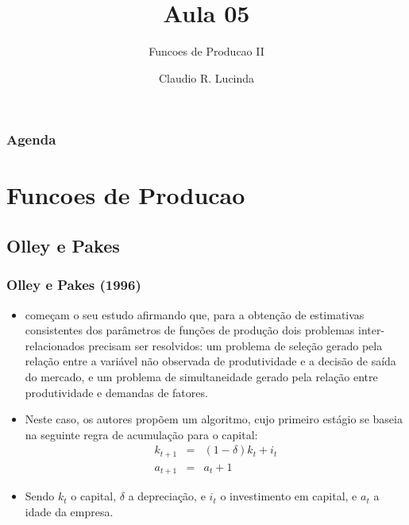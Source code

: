 \documentclass{beamer}
\title{Aula 05}
\subtitle{Funcoes de Producao II}
\author{Claudio R. Lucinda}
\institute{FEA-RP/USP}
\date{}
\begin{document}
\frame{\titlepage}
\begin{frame}\frametitle{Agenda}
  \tableofcontents[pausesections]
\end{frame}

\section{Funcoes de Producao}

\subsection{Olley e Pakes}

\begin{frame}\frametitle{Olley e Pakes (1996)}
\begin{itemize}
\item \citet{Olley1996} começam o seu estudo afirmando que, para a obtenção
de estimativas consistentes dos parâmetros de funções de produção
dois problemas inter-relacionados precisam ser resolvidos: um problema
de seleção gerado pela relação entre a variável não observada de produtividade
e a decisão de saída do mercado, e um problema de simultaneidade gerado
pela relação entre produtividade e demandas de fatores. 
\item Neste caso, os autores propõem um algoritmo, cujo primeiro estágio
se baseia na seguinte regra de acumulação para o capital:
\begin{eqnarray*}
k_{t+1} & = & (1-\delta)k_{t}+i_{t}\\
a_{t+1} & = & a_{t}+1
\end{eqnarray*}
\item Sendo $k_{t}$ o capital, $\delta$ a depreciação, e $i_{t}$ o investimento
em capital, e $a_{t}$ a idade da empresa. 
\end{itemize}
\end{frame}
\end{document}
